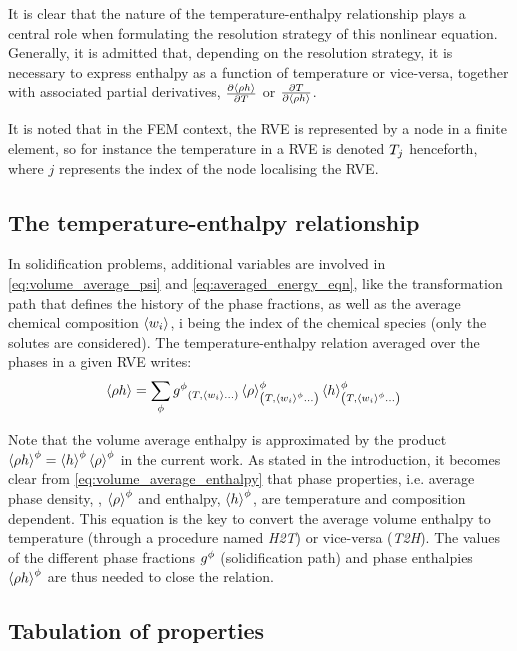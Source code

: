 It is clear that the nature of the temperature-enthalpy relationship plays a central 
role when formulating the resolution strategy of this nonlinear equation. Generally, it is admitted that, depending on the resolution strategy, 
it is necessary to express enthalpy as a function of temperature or vice-versa, together with associated partial derivatives, 
$\frac{\partial \left \langle  \rho h  \right \rangle}{\partial T}$ or $\frac{\partial T }{\partial \left \langle  \rho h  \right \rangle}$.

It is noted that in the FEM context, the RVE is represented by a node in a finite element, so for instance the temperature in a RVE
is denoted $T_j$ henceforth, where $j$ represents the index of the node localising the RVE.

\subsection{The temperature-enthalpy relationship} 

In solidification problems, additional variables are involved in \cref{eq:volume_average_psi} and \cref{eq:averaged_energy_eqn}, 
like the transformation path that defines the history of the phase fractions, as well as the average chemical composition $\left \langle w_i \right \rangle$, 
i being the index of the chemical species (only the solutes are considered). The temperature-enthalpy relation averaged over the 
phases in a given RVE writes:
\begin{align}
\label{eq:volume_average_enthalpy}
& \rh = \sum_\phi \gphi_{\brac{T, \wi \dots}} \rphi_{\brac{T, \wi^{\phi} \dots}} \hphi_{\brac{T, \wi^{\phi} \dots}}
\end{align}

Note that the volume average enthalpy is approximated by the product $\left \langle \rho h \right \rangle^{\phi}=\left \langle h \right \rangle^{\phi}  \left \langle \rho \right \rangle^{\phi} $ in the current work. As stated 
in the introduction, it becomes clear from \cref{eq:volume_average_enthalpy} that phase properties, i.e. average phase density, , $\left \langle \rho \right \rangle^{\phi} $ and enthalpy, $\left \langle h \right \rangle^{\phi} $, 
are temperature and composition dependent. This equation is the key to convert the average volume enthalpy to temperature (through a procedure named \emph{H2T}) 
or vice-versa (\emph{T2H}). The values of the different phase fractions ${g^{\phi}} $ (solidification path) and phase enthalpies $\left \langle  \rho h  \right \rangle^{\phi}$ are thus needed 
to close the relation.

\subsection{Tabulation of properties}

